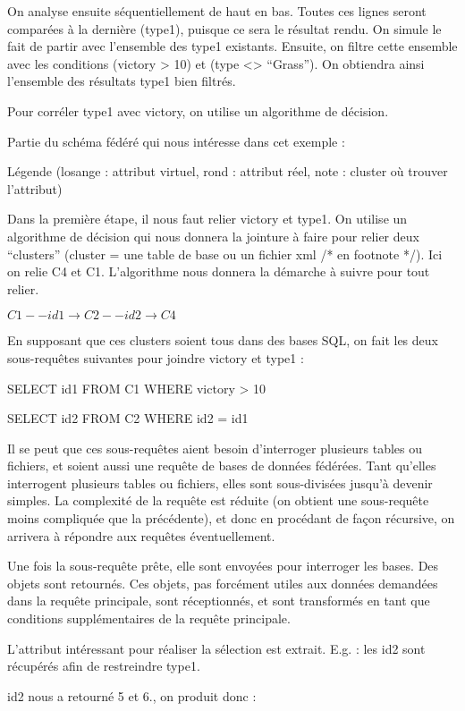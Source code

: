 On analyse ensuite séquentiellement de haut en bas. Toutes ces lignes seront comparées à la dernière (type1), puisque ce sera le résultat rendu. On simule le fait de partir avec l’ensemble des type1 existants. Ensuite, on filtre cette ensemble avec les conditions (victory > 10) et (type <> “Grass”). On obtiendra ainsi l’ensemble des résultats type1 bien filtrés.



Pour corréler type1 avec victory, on utilise un algorithme de décision.

Partie du schéma fédéré qui nous intéresse dans cet exemple :

Légende (losange : attribut virtuel, rond : attribut réel, note : cluster où trouver l’attribut)

Dans la première étape, il nous faut relier victory et type1. On utilise un algorithme de décision qui nous donnera la jointure à faire pour relier deux “clusters” (cluster = une table de base ou un fichier xml /* en footnote */). Ici on relie C4 et C1. L’algorithme nous donnera la démarche à suivre pour tout relier.

$C1 --id1 \rightarrow C2 --id2 \rightarrow  C4$

En supposant que ces clusters soient tous dans des bases SQL, on fait les deux sous-requêtes suivantes pour joindre victory et type1 :

SELECT id1 FROM C1 WHERE victory > 10

SELECT id2 FROM C2 WHERE id2 = id1


Il se peut que ces sous-requêtes aient besoin d’interroger plusieurs tables ou fichiers, et soient aussi une requête de bases de données fédérées. Tant qu’elles interrogent plusieurs tables ou fichiers, elles sont sous-divisées jusqu’à devenir simples. La complexité de la requête est réduite (on obtient une sous-requête moins compliquée que la précédente), et donc en procédant de façon récursive, on arrivera à répondre aux requêtes éventuellement.

Une fois la sous-requête prête, elle sont envoyées pour interroger les bases. Des objets sont retournés. Ces objets, pas forcément utiles aux données demandées dans la requête principale, sont réceptionnés, et sont transformés en tant que conditions supplémentaires de la requête principale.

L’attribut intéressant pour réaliser la sélection est extrait. E.g. : les id2 sont récupérés afin de restreindre type1.

id2 nous a retourné 5 et 6., on produit donc :

